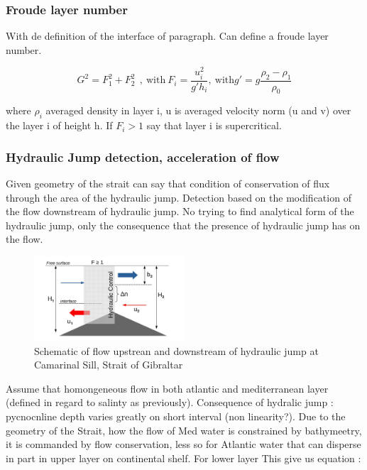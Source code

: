 
\subsubsection{Froude layer number}

With de definition of the interface of paragraph. Can define a froude layer number. 

\begin{equation}
G^2=F_1^2+F_2^2 \ \ , \ \text{with} \ F_i=\frac{u_i^2}{g'h_i} , \ \text{with} g'=g \frac{\rho_2-\rho_1}{\rho_0}
\end{equation}

where $\rho_i$ averaged density in layer i,  u is averaged velocity norm (u and v) over the layer i of height h. If $F_i>1$ say that layer i is supercritical.


\subsubsection{Hydraulic Jump detection, acceleration of flow}
Given geometry of the strait can say that condition of conservation of flux through the area of the hydraulic jump. 
Detection based on the modification of the flow downstream of hydraulic jump. No trying to find analytical form of the hydraulic jump, only the consequence that the presence of hydraulic jump has on the flow.

\begin{figure}[!h]
 \centering
 \includegraphics[width=0.5\textwidth]{./GBR3D/schema_diagressaut.jpg}
 \caption {Schematic of flow upstrean and downstream of hydraulic jump at Camarinal Sill, Strait of Gibraltar}
  \label{schemaRH}
\end{figure}


Assume that homongeneous flow in both atlantic and mediterranean layer (defined in regard to salinty as previously). Consequence of hydralic jump : pycnocnline depth varies greatly on short interval (non linearity?). Due to the geometry of the Strait, how the flow of Med water is constrained by bathymeetry, it is commanded by flow conservation, less so for Atlantic water that can disperse in part in upper layer on continental shelf. For lower layer This give us equation :

